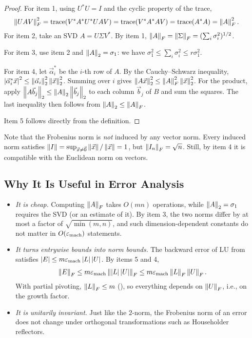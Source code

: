 \begin{proof}
  For item 1, using $U^\ast U = I$ and the cyclic property of the trace,
  \begin{equation}
    \left\lVert UAV \right\rVert_F^2 = \operatorname{trace}(V^\ast A^\ast U^\ast UAV) = \operatorname{trace}(V^\ast A^\ast AV) = \operatorname{trace}(A^\ast A) = \left\lVert A \right\rVert_F^2.
  \end{equation}
  For item 2, take an SVD $A = U\Sigma V^\ast$. By item 1, $\left\lVert A \right\rVert_F = \left\lVert \Sigma \right\rVert_F = (\sum_i\sigma_i^2)^{1/2}$.

  For item 3, use item 2 and $\left\lVert A \right\rVert_2 = \sigma_1$: we have $\sigma_1^2 \le \sum_i\sigma_i^2 \le r\sigma_1^2$.

  For item 4, let $\vec{\alpha}_i^\ast$ be the $i$-th row of $A$. By the Cauchy--Schwarz inequality, $\left\lvert \vec{\alpha}_i^\ast\vec{x} \right\rvert^2 \le \left\lVert \vec{\alpha}_i \right\rVert_2^2\left\lVert \vec{x} \right\rVert_2^2$. Summing over $i$ gives $\left\lVert A\vec{x} \right\rVert_2^2 \le \left\lVert A \right\rVert_F^2\left\lVert \vec{x} \right\rVert_2^2$. For the product, apply $\left\lVert A\vec{b}_j \right\rVert_2 \le \left\lVert A \right\rVert_2\left\lVert \vec{b}_j \right\rVert_2$ to each column $\vec{b}_j$ of $B$ and sum the squares. The last inequality then follows from $\left\lVert A \right\rVert_2 \le \left\lVert A \right\rVert_F$.

  Item 5 follows directly from the definition.
\end{proof}

Note that the Frobenius norm is \emph{not} induced by any vector norm. Every induced norm satisfies $\left\lVert I \right\rVert = \sup_{\vec{x} \ne \vec{0}}\left\lVert \vec{x} \right\rVert/\left\lVert \vec{x} \right\rVert = 1$, but $\left\lVert I_n \right\rVert_F = \sqrt{n}$. Still, by item 4 it is compatible with the Euclidean norm on vectors.

\subsection{Why It Is Useful in Error Analysis}

\begin{itemize}
  \item \emph{It is cheap.} Computing $\left\lVert A \right\rVert_F$ takes $O(mn)$ operations, while $\left\lVert A \right\rVert_2 = \sigma_1$ requires the SVD (or an estimate of it). By item 3, the two norms differ by at most a factor of $\sqrt{\min(m, n)}$, and such dimension-dependent constants do not matter in $O(\varepsilon_{\mathrm{mach}})$ statements.
  \item \emph{It turns entrywise bounds into norm bounds.} The backward error of LU from  satisfies $\left\lvert E \right\rvert \le m\varepsilon_{\mathrm{mach}}\left\lvert L \right\rvert\left\lvert U \right\rvert$. By items 5 and 4,
  \begin{equation}
    \left\lVert E \right\rVert_F \le m\varepsilon_{\mathrm{mach}}\left\lVert \left\lvert L \right\rvert\left\lvert U \right\rvert \right\rVert_F \le m\varepsilon_{\mathrm{mach}}\left\lVert L \right\rVert_F\left\lVert U \right\rVert_F.
  \end{equation}
  With partial pivoting, $\left\lVert L \right\rVert_F \le m$ (), so everything depends on $\left\lVert U \right\rVert_F$, i.e., on the growth factor.
  \item \emph{It is unitarily invariant.} Just like the $2$-norm, the Frobenius norm of an error does not change under orthogonal transformations such as Householder reflectors.
\end{itemize}

